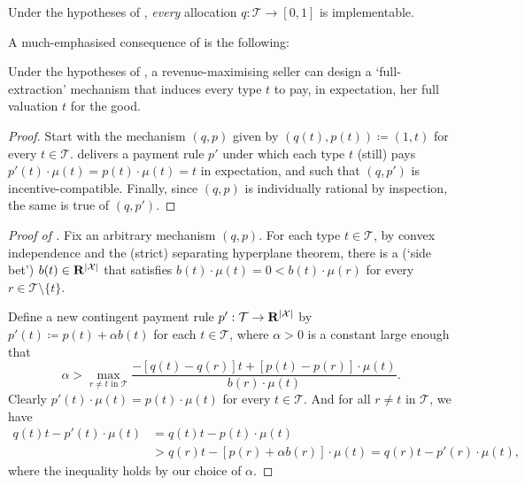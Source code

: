 \begin{corollary}
	\label{corollary:CremerMclean_implementability}
	Under the hypotheses of ,
	\emph{every} allocation $q : \mathcal{T} \to [0,1]$ is implementable.
\end{corollary}

A much-emphasised consequence of  is the following:

\begin{corollary}
	\label{corollary:CremerMclean_fullextraction}
	Under the hypotheses of ,
	a revenue-maximising seller can design a `full-extraction' mechanism that induces every type $t$ to pay, in expectation, her full valuation $t$ for the good.
\end{corollary}

\begin{proof}
	Start with the mechanism $(q,p)$ given by $(q(t),p(t)) \coloneqq (1,t)$ for every $t \in \mathcal{T}$.
	 delivers a payment rule $p'$
	under which each type $t$ (still) pays
	$p'(t) \cdot \mu(t) = p(t) \cdot \mu(t) = t$ in expectation,
	and such that $(q,p')$ is incentive-compatible.
	Finally, since $(q,p)$ is individually rational by inspection,
	the same is true of $(q,p')$.
\end{proof}

\begin{proof}[Proof of ]
	Fix an arbitrary mechanism $(q,p)$.
	For each type $t \in \mathcal{T}$,
	by convex independence and the (strict) separating hyperplane theorem, there is a (`side bet') $b(t) \in \R^{\abs*{\mathcal{X}}}$ that satisfies $b(t) \cdot \mu(t) = 0 < b(t) \cdot \mu(r)$ for every $r \in \mathcal{T} \setminus \{t\}$.

	Define a new contingent payment rule $p' : \mathcal{T} \to \R^{\abs*{\mathcal{X}}}$ by $p'(t) \coloneqq p(t) + \alpha b(t)$ for each $t \in \mathcal{T}$,
	where $\alpha > 0$ is a constant large enough that
	\begin{equation*}
		\alpha
		> \max_{\text{$r \neq t$ in $\mathcal{T}$}} \frac{ - [ q(t) - q(r) ] t + [p(t)-p(r)] \cdot \mu(t) }
		{ b(r) \cdot \mu(t) } .
	\end{equation*}
	Clearly $p'(t) \cdot \mu(t) = p(t) \cdot \mu(t)$ for every $t \in \mathcal{T}$.
	And for all $r \neq t$ in $\mathcal{T}$, we have
	\begin{align*}
		q(t) t - p'(t) \cdot \mu(t)
		&= q(t) t - p(t) \cdot \mu(t)
		\\
		&> q(r) t - [ p(r) + \alpha b(r) ] \cdot \mu(t)
		= q(r) t - p'(r) \cdot \mu(t) ,
	\end{align*}	
	where the inequality holds by our choice of $\alpha$.
\end{proof}

